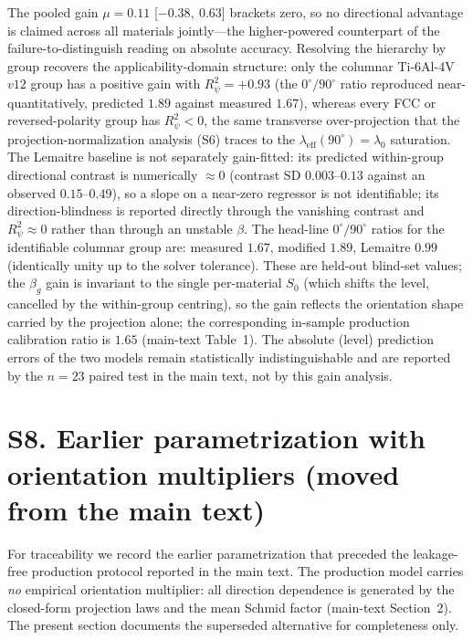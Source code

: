 \documentclass[12pt,a4paper,twocolumn]{article}
\providecommand{\ang}[1]{\ensuremath{#1^{\circ}}}
\begin{document}
The pooled gain $\mu=0.11$ [$-0.38,\ 0.63$] brackets zero, so no directional advantage is claimed across all materials jointly---the higher-powered counterpart of the failure-to-distinguish reading on absolute accuracy. Resolving the hierarchy by group recovers the applicability-domain structure: only the columnar Ti-6Al-4V $v12$ group has a positive gain with $R^2_\psi=+0.93$ (the $\ang{0}/\ang{90}$ ratio reproduced near-quantitatively, predicted $1.89$ against measured $1.67$), whereas every FCC or reversed-polarity group has $R^2_\psi<0$, the same transverse over-projection that the projection-normalization analysis (S6) traces to the $\lambda_{\mathrm{eff}}(\ang{90})=\lambda_0$ saturation. The Lemaitre baseline is not separately gain-fitted: its predicted within-group directional contrast is numerically $\approx0$ (contrast SD $0.003$--$0.13$ against an observed $0.15$--$0.49$), so a slope on a near-zero regressor is not identifiable; its direction-blindness is reported directly through the vanishing contrast and $R^2_\psi\approx0$ rather than through an unstable $\beta$. The head-line $\ang{0}/\ang{90}$ ratios for the identifiable columnar group are: measured $1.67$, modified $1.89$, Lemaitre $0.99$ (identically unity up to the solver tolerance). These are held-out blind-set values; the $\beta_g$ gain is invariant to the single per-material $S_0$ (which shifts the level, cancelled by the within-group centring), so the gain reflects the orientation shape carried by the projection alone; the corresponding in-sample production calibration ratio is $1.65$ (main-text Table~1). The absolute (level) prediction errors of the two models remain statistically indistinguishable and are reported by the $n=23$ paired test in the main text, not by this gain analysis.

\section*{S8. Earlier parametrization with orientation multipliers (moved from the main text)}

For traceability we record the earlier parametrization that preceded the leakage-free production protocol reported in the main text. The production model carries \emph{no} empirical orientation multiplier: all direction dependence is generated by the closed-form projection laws and the mean Schmid factor (main-text Section~2). The present section documents the superseded alternative for completeness only.
\end{document}
